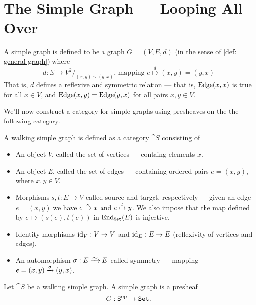 \section{The Simple Graph --- Looping All Over}

\begin{definition}\label{def: simp-graph}
    A simple graph is defined to be a graph \(G = (V, E, d)\) (in the sense of
    \cref{def: general-graph}) where
    \[
        d: E \to V^2/_{(x, y) \sim (y, x)}
        \text{, mapping }
        e \overset d \longmapsto (x, y) = (y, x)
    \]
    That is, \(d\) defines a reflexive and symmetric relation --- that is,
    \(\operatorname{Edge}(x, x)\) is true for all \(x \in V\), and \(\operatorname{Edge}(x, y) = \operatorname{Edge}(y, x)\)
    for all pairs \(x, y \in V\).
\end{definition}

We'll now construct a category for simple graphs using presheaves on the the
following category.

\begin{definition}\label{def: walking-simp-graph}
    A walking simple graph is defined as a category \(\cat S\) consisting of
    \begin{itemize}
        \setlength\itemsep{0.0em}
        \item An object \(V\), called the set of vertices --- containg elements
              \(x\).
        \item An object \(E\), called the set of edges --- containing ordered pairs
              \(e = (x, y)\), where \(x, y \in V\).
        \item Morphisms \(s, t: E \to V\) called source and target, respectively ---
              given an edge \(e = (x, y)\) we have \(e \xmapsto{s} x\) and \(e \xmapsto{t}
              y\). We also impose that the map defined by \(e \mapsto (s(e), t(e))\)
              in \(\operatorname{End}_{{\texttt{Set}}}(E)\) is injective.
        \item Identity morphisms \(\operatorname{id}_V: V \to V\) and \(\operatorname{id}_E: E \to E\)
              (reflexivity of vertices and edges).
        \item An automorphism \(\sigma: E \isoto E\) called symmetry --- mapping \(e =
              (x, y) \xmapsto\sigma (y, x)\).
    \end{itemize}
\end{definition}

\begin{proposition}\label{prop: simp-graph-presheaf}
    Let \(\cat S\) be a walking simple graph. A simple graph is a presheaf
    \[
        G: \texttt S^{\mathrm{op}} \to {\texttt{Set}}.
    \]
\end{proposition}

